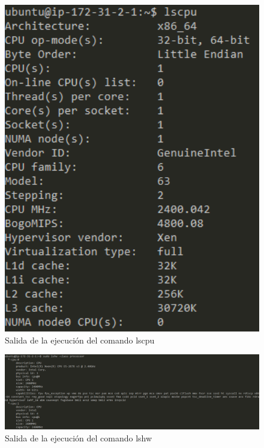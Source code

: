 \begin{figure}[H]
   \centering
   \includegraphics[width=12cm]{img/lscpu}
   \caption{Salida de la ejecución del comando lscpu}
   \label{figura:lscpu}
\end{figure}
\begin{figure}[H]
   \centering
   \includegraphics[width=12cm]{img/lshw}
   \caption{Salida de la ejecución del comando lshw}
   \label{figura:lshw}
\end{figure}
